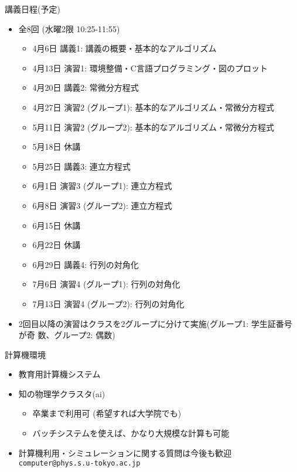 \documentclass[10pt,dvipdfmx]{beamer}
\begin{document}
\begin{frame}[t]{講義日程(予定)}
  \begin{itemize}
  \item 全8回 (水曜2限 10:25-11:55)
    \begin{itemize}
    \item 4月6日 講義1: 講義の概要・基本的なアルゴリズム
    \item 4月13日 演習1: 環境整備・C言語プログラミング・図のプロット
    \item 4月20日 講義2: 常微分方程式
    \item 4月27日 演習2 (グループ1): 基本的なアルゴリズム・常微分方程式
    \item 5月11日 演習2 (グループ2): 基本的なアルゴリズム・常微分方程式
    \item {\color{gray} 5月18日 休講}
    \item 5月25日 講義3: 連立方程式
    \item 6月1日 演習3 (グループ1): 連立方程式
    \item 6月8日 演習3 (グループ2): 連立方程式
    \item {\color{gray} 6月15日 休講}
    \item {\color{gray} 6月22日 休講}
    \item 6月29日 講義4: 行列の対角化
    \item 7月6日 演習4 (グループ1): 行列の対角化
    \item 7月13日 演習4 (グループ2): 行列の対角化
    \end{itemize}
  \item 2回目以降の演習はクラスを2グループに分けて実施(グループ1: 学生証番号が奇
数、グループ2: 偶数)
  \end{itemize}
\end{frame}


\begin{frame}[t,fragile]{計算機環境}
  \begin{itemize}
  \item 教育用計算機システム
  \item 知の物理学クラスタ(ai)
    \begin{itemize}
    \item 卒業まで利用可 (希望すれば大学院でも)
    \item バッチシステムを使えば、かなり大規模な計算も可能
    \end{itemize}
  \item 計算機利用・シミュレーションに関する質問は今後も歓迎 {\tt computer@phys.s.u-tokyo.ac.jp}
  \end{itemize}
\end{frame}
\end{document}
